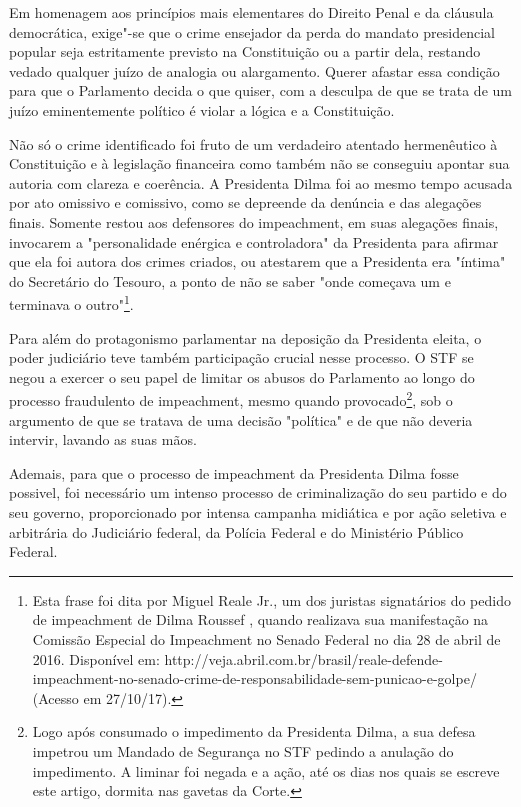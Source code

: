 Em homenagem aos princípios mais elementares do Direito Penal e da
cláusula democrática, exige"-se que o crime ensejador da perda do mandato
presidencial popular seja estritamente previsto na Constituição ou a
partir dela, restando vedado qualquer juízo de analogia ou alargamento.
Querer afastar essa condição para que o Parlamento decida o que quiser,
com a desculpa de que se trata de um juízo eminentemente político é
violar a lógica e a Constituição.

Não só o crime identificado foi fruto de um verdadeiro atentado
hermenêutico à Constituição e à legislação financeira como também não se
conseguiu apontar sua autoria com clareza e coerência. A Presidenta
Dilma foi ao mesmo tempo acusada por ato omissivo e comissivo, como se
depreende da denúncia e das alegações finais. Somente restou aos
defensores do impeachment, em suas alegações finais, invocarem a
"personalidade enérgica e controladora" da Presidenta para afirmar que
ela foi autora dos crimes criados, ou atestarem que a Presidenta era
"íntima" do Secretário do Tesouro, a ponto de não se saber "onde
começava um e terminava o outro"\footnote{Esta frase foi dita por Miguel
  Reale Jr., um dos juristas signatários do pedido de impeachment de
  Dilma Roussef , quando realizava sua manifestação na Comissão Especial
  do Impeachment no Senado Federal no dia 28 de abril de 2016.
  Disponível em:
  http://veja.abril.com.br/brasil/reale-defende-impeachment-no-senado-crime-de-responsabilidade-sem-punicao-e-golpe/
  (Acesso em 27/10/17).}.

Para além do protagonismo parlamentar na deposição da Presidenta eleita,
o poder judiciário teve também participação crucial nesse processo. O
STF se negou a exercer o seu papel de limitar os abusos do Parlamento ao
longo do processo fraudulento de impeachment, mesmo quando
provocado\footnote{Logo após consumado o impedimento da Presidenta
  Dilma, a sua defesa impetrou um Mandado de Segurança no STF pedindo a
  anulação do impedimento. A liminar foi negada e a ação, até os dias
  nos quais se escreve este artigo, dormita nas gavetas da Corte.}, sob
o argumento de que se tratava de uma decisão "política" e de que não
deveria intervir, lavando as suas mãos.

Ademais, para que o processo de impeachment da Presidenta Dilma fosse
possivel, foi necessário um intenso processo de criminalização do seu
partido e do seu governo, proporcionado por intensa campanha midiática e
por ação seletiva e arbitrária do Judiciário federal, da Polícia Federal
e do Ministério Público Federal.

